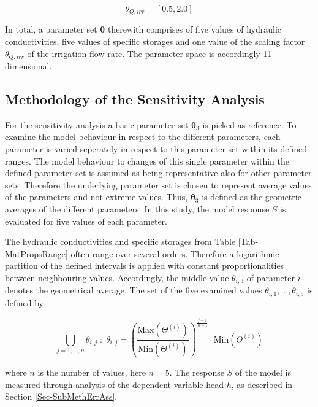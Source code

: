\begin{equation}
    \theta_{Q,irr} = \left[ 0.5, 2.0 \right]
\end{equation}

In total, a parameter set $\bm{\theta}$ therewith comprises of five values of hydraulic conductivities, five values of specific storages and one value of the scaling factor $\theta_{Q,irr}$ of the irrigation flow rate. 
The parameter space is accordingly 11-dimensional.


\subsection{Methodology of the Sensitivity Analysis}
\label{Sec-SubMethSAna}

For the sensitivity analysis a basic parameter set $\bm{\theta}_3$ is picked as reference. 
To examine the model behaviour in respect to the different parameters, each parameter is varied seperately in respect to this parameter set within its defined ranges. 
The model behaviour to changes of this single parameter within the defined parameter set is assumed as being representative also for other parameter sets. 
Therefore the underlying parameter set is chosen to represent average values of the parameters and not extreme values. 
Thus, $\bm{\theta}_3$ is defined as the geometric averages of the different parameters. 
In this study, the model response $S$ is evaluated for five values of each parameter. 
    
The hydraulic conductivities and specific storages from Table \ref{Tab-MatPropsRange} often range over several orders. 
Therefore a logarithmic partition of the defined intervals is applied with constant proportionalities between neighbouring values. 
Accordingly, the middle value $\theta_{i,3}$ of parameter $i$ denotes the geometrical average. 
The set of the five examined values $\theta_{i,1},...,\theta_{i,5}$ is defined by

\begin{equation}
    \label{Eq-ParamValCalc}
    \bigcup_{j=1,...,n} \theta_{i,j} \; : \; \theta_{i,j} = \left( \frac{\textrm{Max}(\Theta^{(i)})}{\textrm{Min}(\Theta^{(i)})} \right) ^{\frac{j-1}{n-1}} \cdot \textrm{Min}(\Theta^{(i)})
\end{equation}

\noindent where $n$ is the number of values, here $n=5$. 
The response $S$ of the model is measured through analysis of the dependent variable head $h$, as described in Section \ref{Sec-SubMethErrAss}.

